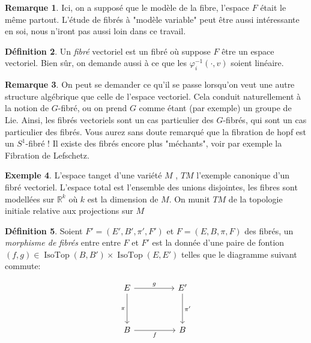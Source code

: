 \documentclass[a4paper,12pt,oneside,titlepage]{article}
\newcommand{\R}[0]{\mathbb{R}}
\theoremstyle{definition}
\newtheorem{definition}{Définition}[section]
\newtheorem{remarque}[definition]{Remarque}
\newtheorem{exemple}[definition]{Exemple}
\theoremstyle{plain}
\begin{document}
\begin{remarque}
    Ici, on a supposé que le modèle de la fibre, l'espace $F$ était le même partout. L'étude de fibrés à "modèle variable" peut être aussi intéressante en soi, nous n'iront pas aussi loin dans ce travail.
\end{remarque}

\begin{definition}
    Un \textit{fibré} vectoriel est un fibré où suppose $F$ être un espace vectoriel. Bien sûr, on demande aussi à ce que les  $\varphi_i^{-1}(\cdot,v)$ soient linéaire.
\end{definition}

\begin{remarque}
    On peut se demander ce qu'il se passe lorsqu'on veut une autre structure algébrique que celle de l'espace vectoriel. Cela conduit naturellement à la notion de $G$-fibré, ou on prend $G$ comme étant (par exemple) un groupe de Lie. Ainsi, les fibrés vectoriels sont un cas particulier des $G$-fibrés, qui sont un cas particulier des fibrés. Vous aurez sans doute remarqué que la fibration de hopf est un $S^1$-fibré ! Il existe des fibrés encore plus "méchants", voir par exemple la Fibration de Lefschetz.
\end{remarque}

\begin{exemple}
    L'espace tanget d'une variété $M$ , $TM$ l'exemple canonique d'un fibré vectoriel. L'espace total est l'ensemble des unions disjointes, les fibres sont modellées sur $\R^k$ où $k$ est la dimension de $M$. On munit $TM$ de la topologie initiale relative aux projections sur $M$
\end{exemple}

\begin{definition}
    Soient $F'=(E',B',\pi',F')$ et $F=(E,B,\pi,F)$ des fibrés, un \textit{morphisme de fibrés} entre entre $F$ et $F'$ est la donnée 
    d'une paire de fontion $(f,g)\in \operatorname{IsoTop}(B,B')
    \times\operatorname{IsoTop}(E,E')$ telles que le diagramme suivant 
    commute: \\
    \begin{center}
        \[\begin{tikzcd}
	E && {E'} \\
	\\
	B && B
	\arrow["g", from=1-1, to=1-3]
	\arrow["\pi"', from=1-1, to=3-1]
	\arrow["{\pi'}", from=1-3, to=3-3]
	\arrow["f"', from=3-1, to=3-3]
\end{tikzcd}\]
    \end{center}
\end{definition}
\end{document}
